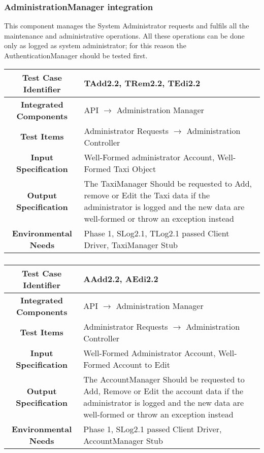 \documentclass[11pt, a4paper,titlepage]{article}
\begin{document}
	 \subsubsection{AdministrationManager integration}
	This component manages the System Administrator requests and fulfils all the maintenance and administrative operations. All these operations can be done only as logged as system administrator; for this reason the AuthenticationManager should be tested first.
	\begin{tabularx}{\textwidth}{| c|X|}
	 		\hline \textbf{Test Case Identifier} & \label{TAdd2.2}TAdd2.2, \label{TRem2.2}TRem2.2, \label{TEdi2.2}TEdi2.2 \\
	 		\hline \textbf{Integrated Components} &  API $\rightarrow $ Administration Manager \\
	 		\hline \textbf{Test Items} &  Administrator Requests  $\rightarrow $ Administration Controller\\
	 		\hline \textbf{Input Specification} &  Well-Formed administrator Account, Well-Formed Taxi Object \\
	 		\hline \textbf{Output Specification} & The TaxiManager Should be requested to Add, remove or Edit the Taxi data if the administrator is logged and the new data are well-formed or throw an exception instead\\
	 		\hline \textbf{Environmental Needs} &  Phase 1, SLog2.1, TLog2.1 passed \newline 
	 		Client Driver, TaxiManager Stub\\
	 		\hline
	 \end{tabularx}
	 \newline
	 \subsubsection{}
	\begin{tabularx}{\textwidth}{| c|X|}
		 	\hline \textbf{Test Case Identifier} & \label{AAdd2.2}AAdd2.2, \label{AEdi2.2}AEdi2.2 \\
		 	\hline \textbf{Integrated Components} &  API $\rightarrow $ Administration Manager \\
		 	\hline \textbf{Test Items} &  Administrator Requests  $\rightarrow $ Administration Controller\\
		 	\hline \textbf{Input Specification} &  Well-Formed Administrator Account, Well-Formed Account to Edit \\
		 	\hline \textbf{Output Specification} & The AccountManager Should be requested to Add, Remove or Edit the account data if the administrator is logged and the new data are well-formed or throw an exception instead\\
		 	\hline \textbf{Environmental Needs} &  Phase 1, SLog2.1 passed \newline 
		 	Client Driver, AccountManager Stub\\
		 	\hline
		 \end{tabularx}
		 \newline
\end{document}
